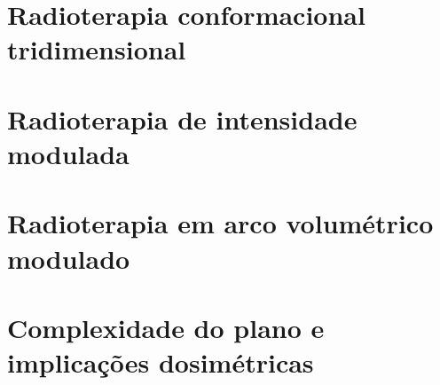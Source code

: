 \section{Radioterapia conformacional tridimensional}
\label{sec:crt3d}

\section{Radioterapia de intensidade modulada}
\label{sec:imrt}

\section{Radioterapia em arco volumétrico modulado}
\label{sec:vmat}

\section{Complexidade do plano e implicações dosimétricas}
\label{sec:complexidade_plano}



